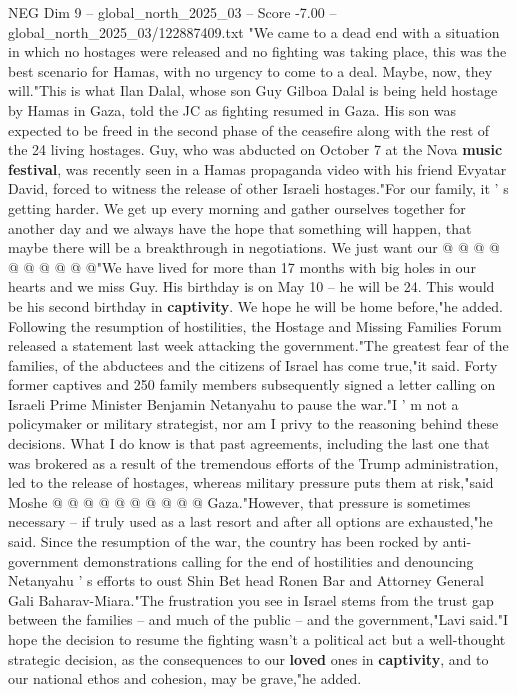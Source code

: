 \begin{textsample}{NEG Dim 9 – global\_north\_2025\_03 – Score -7.00 – global\_north\_2025\_03/122887409.txt}  \label{ex:f9_neg_144}
"We came to a dead end with a situation in which no hostages were released and no fighting was taking place, this was the best scenario for Hamas, with no urgency to come to a deal.
Maybe, now, they will."This is what Ilan Dalal, whose son Guy Gilboa Dalal is being held hostage by Hamas in Gaza, told the JC as fighting resumed in Gaza.
His son was expected to be freed in the second phase of the ceasefire along with the rest of the 24 living hostages.
Guy, who was abducted on October 7 at the Nova \textbf{music} \textbf{festival}, was recently seen in a Hamas propaganda video with his friend Evyatar David, forced to witness the release of other Israeli hostages."For our family, it ' s getting harder.
We get up every morning and gather ourselves together for another day and we always have the hope that something will happen, that maybe there will be a breakthrough in negotiations.
We just want our @ @ @ @ @ @ @ @ @ @"We have lived for more than 17 months with big holes in our hearts and we miss Guy.
His birthday is on May 10 -- he will be 24.
This would be his second birthday in \textbf{captivity}.
We hope he will be home before,"he added.
Following the resumption of hostilities, the Hostage and Missing Families Forum released a statement last week attacking the government."The greatest fear of the families, of the abductees and the citizens of Israel has come true,"it said.
Forty former captives and 250 family members subsequently signed a letter calling on Israeli Prime Minister Benjamin Netanyahu to pause the war."I ' m not a policymaker or military strategist, nor am I privy to the reasoning behind these decisions.
What I do know is that past agreements, including the last one that was brokered as a result of the tremendous efforts of the Trump administration, led to the release of hostages, whereas military pressure puts them at risk,"said Moshe @ @ @ @ @ @ @ @ @ @ Gaza."However, that pressure is sometimes necessary -- if truly used as a last resort and after all options are exhausted,"he said.
Since the resumption of the war, the country has been rocked by anti-government demonstrations calling for the end of hostilities and denouncing Netanyahu ' s efforts to oust Shin Bet head Ronen Bar and Attorney General Gali Baharav-Miara."The frustration you see in Israel stems from the trust gap between the families -- and much of the public -- and the government,"Lavi said."I hope the decision to resume the fighting wasn't a political act but a well-thought strategic decision, as the consequences to our \textbf{loved} ones in \textbf{captivity}, and to our national ethos and cohesion, may be grave,"he added.

\end{textsample}
